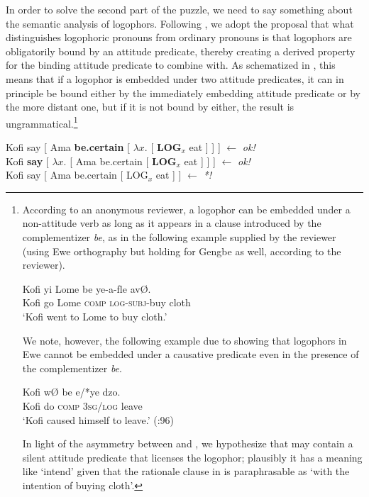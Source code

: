 \documentclass[output=paper,modfonts,nonflat]{langsci/langscibook}
\begin{document}
In order to solve the second part of the puzzle, we need to say something about the semantic analysis of logophors. Following \cite{Heim2002, Stechow2009, Stechow2003, Pearson2015}, we adopt the proposal that what distinguishes logophoric pronouns from ordinary pronouns is that logophors are obligatorily bound by an attitude predicate, thereby creating a derived property for the binding attitude predicate to combine with. As schematized in , this means that  if a logophor is embedded under two attitude predicates, it can in principle be bound either by the immediately embedding attitude predicate or by the more distant one, but if it is not bound by either, the result is ungrammatical.\footnote{According to an anonymous reviewer, a logophor can be embedded under a non-attitude verb as long as it appears in a clause introduced by the complementizer \emph{be}, as in the following example supplied by the reviewer (using Ewe orthography but holding for Gengbe as well, according to the reviewer).


\ea \label{ex:grano:reviewerLogophor:28}
\gll Kofi yi Lome be ye-a-ƒle av{\O}.\\
Kofi go Lome \textsc{comp} \textsc{log}-\textsc{subj}-buy cloth\\
\glt `Kofi went to Lome to buy cloth.'
\z

We note, however, the following example due to \cite{Pearson2015} showing that logophors in Ewe cannot be embedded under a causative predicate even in the presence of the complementizer \emph{be}. 

\ea \label{ex:grano:complementizerBe:29}
\gll Kofi w{\O} be e/*ye dzo.\\
Kofi do \textsc{comp} 3\textsc{sg}/\textsc{log} leave\\
\glt `Kofi caused himself to leave.' (\citealt{Pearson2015}:96)
\z

In light of the asymmetry between  and , we hypothesize that  may contain a silent attitude predicate that licenses the logophor; plausibly it has a meaning like `intend' given that the rationale clause in  is paraphrasable as `with the intention of buying cloth'.

}


\ea  \label{ex:grano:log:30}
    \begin{xlist}
    \ex Kofi say [ Ama \textbf{be.certain} [ $\lambda x$. [ \textbf{LOG}$_{x}$ eat ] ] ] \hfill $\leftarrow$ \emph{ok!}\\
    \ex Kofi \textbf{say} [ $\lambda x$. [ Ama be.certain  [ \textbf{LOG}$_{x}$ eat ] ] ] \hfill $\leftarrow$ \emph{ok!} \\
    \ex Kofi say  [ Ama be.certain  [ LOG$_{x}$ eat ] ] \hfill $\leftarrow$ \emph{*!}
    \end{xlist}
\z
\end{document}
